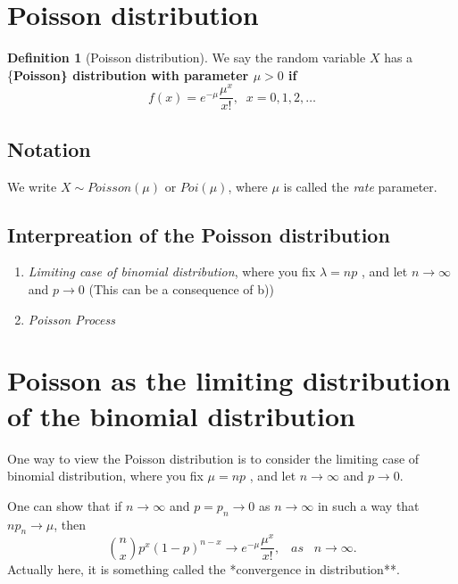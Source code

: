 \documentclass[
]{book}
\theoremstyle{definition}
\newtheorem{definition}{Definition}[chapter]
\theoremstyle{definition}
\theoremstyle{definition}
\theoremstyle{definition}
\theoremstyle{remark}
\begin{document}
\section{Poisson distribution}\label{poisson-distribution}

\begin{definition}[Poisson distribution]
We say the random variable \(X\) has a \{\bf Poisson\} distribution with parameter \(\mu > 0\) if
\[
f(x) = e^{-\mu} \frac{ \mu^x}{x!},\;\;x=0,1,2,\dots\]
\end{definition}

\subsection{Notation}\label{notation}

We write \(X\sim Poisson(\mu)\) or \(Poi(\mu)\), where \(\mu\) is called the \emph{rate} parameter.

\subsection{Interpreation of the Poisson distribution}\label{interpreation-of-the-poisson-distribution}

\begin{enumerate}
\def\labelenumi{\arabic{enumi}.}
\item
  \emph{Limiting case of binomial distribution}, where you fix \(\lambda = np\) , and let \(n \rightarrow \infty\) and \(p \rightarrow 0\) (This can be a consequence of b))
\item
  \emph{Poisson Process}
\end{enumerate}

\section{Poisson as the limiting distribution of the binomial distribution}\label{poisson-as-the-limiting-distribution-of-the-binomial-distribution}

One way to view the Poisson distribution is to consider the limiting case of binomial distribution, where you fix \(\mu = np\) , and let \(n \rightarrow \infty\) and \(p \rightarrow 0\).

One can show that if \(n\to \infty\) and \(p=p_n \to 0\) as \(n\to \infty\) in such a way that \(n p_n \to \mu\), then
\[
{n \choose x} p^x (1-p)^{n-x} \to e^{-\mu} \frac{ \mu^x}{x!},\;\;\;as\;\;\; n\to \infty.
\]
Actually here, it is something called the *convergence in distribution**.
\end{document}
